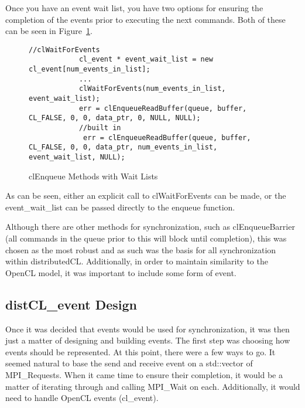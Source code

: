 \documentclass[../thesis.tex]{subfiles}
\begin{document}
        Once you have an event wait list, you have two options for ensuring the completion of the events prior to executing the next commands. Both of these can be seen in Figure~\ref{fig:cl_enqueue_wait_list}.

        \begin{figure}[htbp]
            \centering
            \lstset{language=cpp}  
            \begin{lstlisting}[tabsize=2]
            //clWaitForEvents
            cl_event * event_wait_list = new cl_event[num_events_in_list];
            ...
            clWaitForEvents(num_events_in_list, event_wait_list);
            err = clEnqueueReadBuffer(queue, buffer, CL_FALSE, 0, 0, data_ptr, 0, NULL, NULL);
            //built in
             err = clEnqueueReadBuffer(queue, buffer, CL_FALSE, 0, 0, data_ptr, num_events_in_list, event_wait_list, NULL);
            \end{lstlisting}
            \caption{clEnqueue Methods with Wait Lists}
            \label{fig:cl_enqueue_wait_list}
        \end{figure}

        As can be seen, either an explicit call to clWaitForEvents can be made, or the event\_wait\_list can be passed directly to the enqueue function.

        Although there are other methods for synchronization, such as clEnqueueBarrier (all commands in the queue prior to this will block until completion), this was chosen as the most robust and as such was the basis for all synchronization within distributedCL. Additionally, in order to maintain similarity to the OpenCL model, it was important to include some form of event.

    \subsection{distCL\_event Design} %
    \label{sub:distcl_event_design}
        Once it was decided that events would be used for synchronization, it was then just a matter of designing and building events. The first step was choosing how events should be represented. At this point, there were a few ways to go. It seemed natural to base the send and receive event on a std::vector of MPI\_Requests. When it came time to ensure their completion, it would be a matter of iterating through and calling MPI\_Wait on each. Additionally, it would need to handle OpenCL events (cl\_event). 
\end{document}

